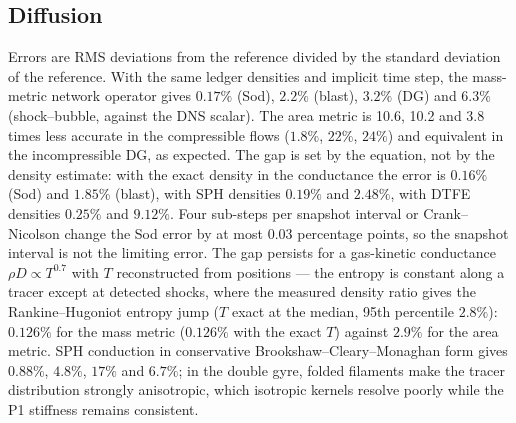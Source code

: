\documentclass[11pt]{article}
\theoremstyle{definition}\newtheorem{definition}{Definition}\theoremstyle{remark}\newtheorem{remark}{Remark}
\begin{document}
\subsection{Diffusion}\label{sec:diff}
Errors are RMS deviations from the reference divided by the standard deviation of the reference. With the same ledger densities and implicit time step, the mass-metric network operator gives $0.17\%$ (Sod), $2.2\%$ (blast), $3.2\%$ (DG) and $6.3\%$ (shock--bubble, against the DNS scalar). The area metric is 10.6, 10.2 and 3.8 times less accurate in the compressible flows ($1.8\%$, $22\%$, $24\%$) and equivalent in the incompressible DG, as expected. The gap is set by the equation, not by the density estimate: with the exact density in the conductance the error is $0.16\%$ (Sod) and $1.85\%$ (blast), with SPH densities $0.19\%$ and $2.48\%$, with DTFE densities $0.25\%$ and $9.12\%$. Four sub-steps per snapshot interval or Crank--Nicolson change the Sod error by at most $0.03$ percentage points, so the snapshot interval is not the limiting error. The gap persists for a gas-kinetic conductance $\rho D\propto T^{0.7}$ with $T$ reconstructed from positions --- the entropy is constant along a tracer except at detected shocks, where the measured density ratio gives the Rankine--Hugoniot entropy jump ($T$ exact at the median, 95th percentile $2.8\%$): $0.126\%$ for the mass metric ($0.126\%$ with the exact $T$) against $2.9\%$ for the area metric. SPH conduction in conservative Brookshaw--Cleary--Monaghan form \citep{ClearyMonaghan1999} gives $0.88\%$, $4.8\%$, $17\%$ and $6.7\%$; in the double gyre, folded filaments make the tracer distribution strongly anisotropic, which isotropic kernels resolve poorly while the P1 stiffness remains consistent.
\end{document}
